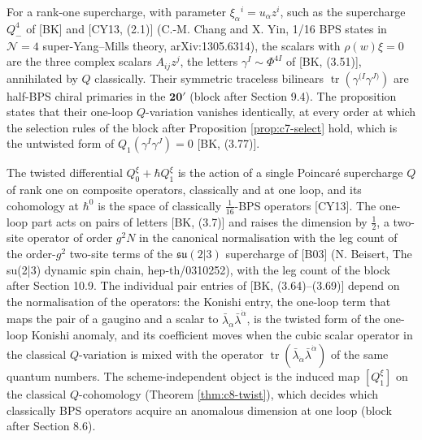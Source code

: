 \begin{remark}
For a rank-one supercharge, with parameter $\xi_\alpha{}^i=u_\alpha z^i$, such as the supercharge $Q^4_-$ of [BK] and [CY13, (2.1)] (C.-M. Chang and X. Yin, 1/16 BPS states in $\mathcal N=4$ super-Yang--Mills theory, arXiv:1305.6314), the scalars with $\rho(w)\xi=0$ are the three complex scalars $A_{ij}z^j$, the letters $\gamma^I\sim\Phi^{4I}$ of [BK, (3.51)], annihilated by $Q$ classically. Their symmetric traceless bilinears $\operatorname{tr}(\gamma^{(I}\gamma^{J)})$ are half-BPS chiral primaries in the $\mathbf{20'}$ (block after Section 9.4). The proposition states that their one-loop $Q$-variation vanishes identically, at every order at which the selection rules of the block after Proposition \ref{prop:c7-select} hold, which is the untwisted form of $Q_1(\gamma^I\gamma^J)=0$ [BK, (3.77)].
\end{remark}

\begin{remark}
The twisted differential $Q^\xi_0+\hbar Q^\xi_1$ is the action of a single Poincar\'e supercharge $Q$ of rank one on composite operators, classically and at one loop, and its cohomology at $\hbar^0$ is the space of classically $\tfrac1{16}$-BPS operators [CY13]. The one-loop part acts on pairs of letters [BK, (3.7)] and raises the dimension by $\tfrac12$, a two-site operator of order $g^2N$ in the canonical normalisation with the leg count of the order-$g^2$ two-site terms of the $\mathfrak{su}(2|3)$ supercharge of [B03] (N. Beisert, The su(2|3) dynamic spin chain, hep-th/0310252), with the leg count of the block after Section 10.9. The individual pair entries of [BK, (3.64)--(3.69)] depend on the normalisation of the operators: the Konishi entry, the one-loop term that maps the pair of a gaugino and a scalar to $\bar\lambda_{\dot\alpha}\bar\lambda^{\dot\alpha}$, is the twisted form of the one-loop Konishi anomaly, and its coefficient moves when the cubic scalar operator in the classical $Q$-variation is mixed with the operator $\operatorname{tr}(\bar\lambda_{\dot\alpha}\bar\lambda^{\dot\alpha})$ of the same quantum numbers. The scheme-independent object is the induced map $[Q^\xi_1]$ on the classical $Q$-cohomology (Theorem \ref{thm:c8-twist}), which decides which classically BPS operators acquire an anomalous dimension at one loop (block after Section 8.6).
\end{remark}

